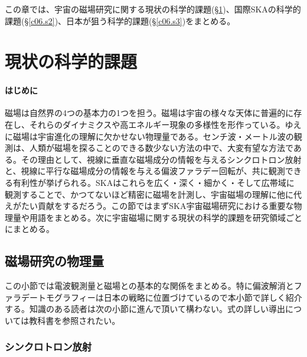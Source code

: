 

この章では、宇宙の磁場研究に関する現状の科学的課題(\S \ref{c06.s1})、国際SKAの科学的課題(\S \ref{c06.s2})、日本が狙う科学的課題(\S \ref{c06.s3})をまとめる。

\setcounter{section}{0}\section{現状の科学的課題}
\label{c06.s1}

\paragraph{はじめに}

磁場は自然界の4つの基本力の1つを担う。磁場は宇宙の様々な天体に普遍的に存在し、それらのダイナミクスや高エネルギー現象の多様性を形作っている。ゆえに磁場は宇宙進化の理解に欠かせない物理量である。センチ波・メートル波の観測は、人類が磁場を探ることのできる数少ない方法の中で、大変有望な方法である。その理由として、視線に垂直な磁場成分の情報を与えるシンクロトロン放射と、視線に平行な磁場成分の情報を与える偏波ファラデー回転が、共に観測できる有利性が挙げられる。SKAはこれらを広く・深く・細かく・そして広帯域に観測することで、かつてないほど精密に磁場を計測し、宇宙磁場の理解に他に代えがたい貢献をするだろう。この節ではまずSKA宇宙磁場研究における重要な物理量や用語をまとめる。次に宇宙磁場に関する現状の科学的課題を研究領域ごとにまとめる。

\subsection{磁場研究の物理量}
\label{c06.s1.ss1}

この小節では電波観測量と磁場との基本的な関係をまとめる。特に偏波解消とファラデートモグラフィーは日本の戦略に位置づけているので本小節で詳しく紹介する。知識のある読者は次の小節に進んで頂いて構わない。式の詳しい導出については教科書\citep{1979rpa..book.....R,1996tra..book.....R}を参照されたい。

\subsubsection{シンクロトロン放射}
\label{c06.s1.ss1.sss1}

